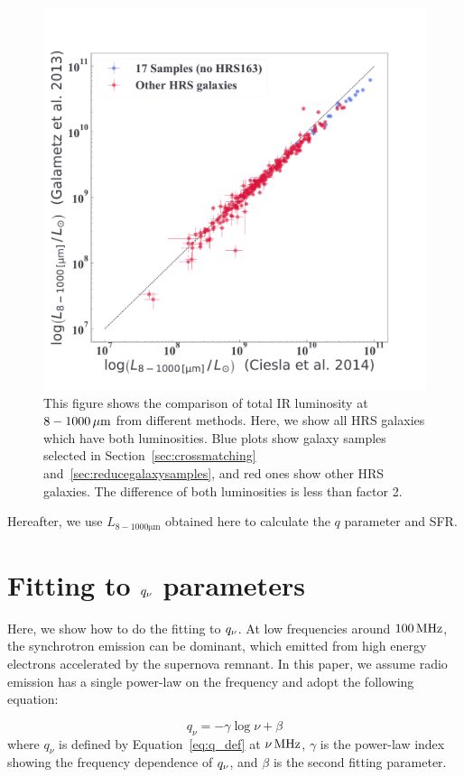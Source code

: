 \begin{figure}[htbp]
	\centering
	\includegraphics[width=.7\linewidth]{Chapter_4/Figures/Method_TIRcomparison.pdf}
    \caption[The comparison of total IR luminosities]{\label{fig:tircomparison}
        This figure shows the comparison of total IR luminosity at $8-1000\,\mathrm{\mu m}$ from different methods.
        Here, we show all HRS galaxies which have both luminosities.
        Blue plots show galaxy samples selected in Section~\ref{sec:crossmatching} and~\ref{sec:reducegalaxysamples}, and red ones show other HRS galaxies.
        The difference of both luminosities is less than factor 2.
    }
\end{figure}

Hereafter, we use $L_{8-1000\mathrm{\mu m}}$ obtained here to calculate the $q$ parameter and SFR\@.



\section{Fitting to $q_{\nu}$ parameters}\label{sec:fittingtoq}
Here, we show how to do the fitting to $q_{\nu}$.
At low frequencies around $100\,\mathrm{MHz}$, the synchrotron emission can be dominant, which emitted from high energy electrons accelerated by the supernova remnant.
In this paper, we assume radio emission has a single power-law on the frequency and adopt the following equation:

\begin{equation}\label{eq:q_fitting}
    q_{\nu} = -\gamma\log{\nu} + \beta
\end{equation}
where $q_{\nu}$ is defined by Equation~\ref{eq:q_def} at $\nu\,\mathrm{MHz}$, $\gamma$ is the power-law index showing the frequency dependence of $q_{\nu}$, and $\beta$ is the second fitting parameter.

